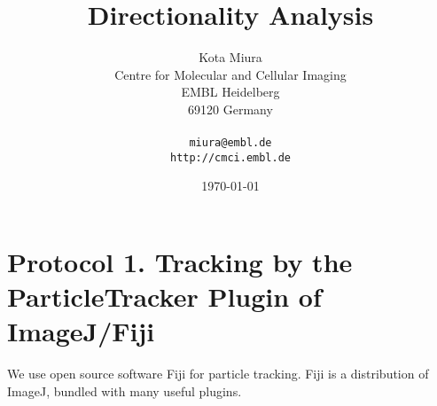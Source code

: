 \documentclass[11pnt]{article}
\begin{document}
\author{Kota Miura\\
  Centre for Molecular and Cellular Imaging\\
  EMBL Heidelberg\\
  69120  Germany\\
  \\
  \texttt{miura@embl.de}\\
  \texttt{http://cmci.embl.de}}
\date{\today}
\title{Directionality Analysis}
\maketitle

\section{Protocol 1. Tracking by the ParticleTracker Plugin of ImageJ/Fiji}

We use open source software Fiji for particle tracking. Fiji is a distribution of ImageJ, bundled with many useful plugins. 
\end{document}
